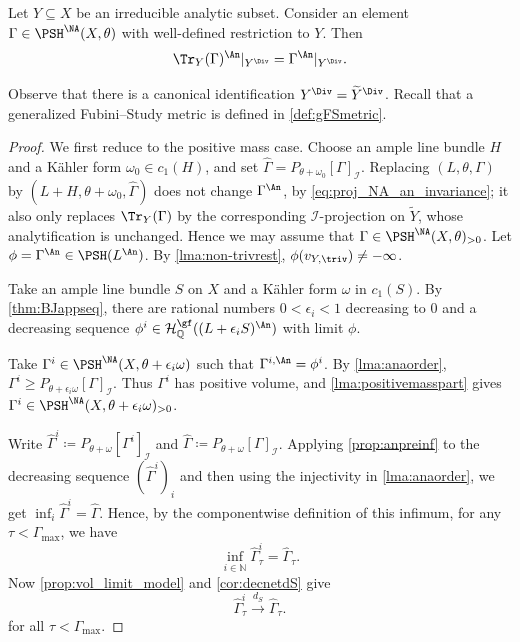 \begin{theorem}\label{thm:comp_traceop}
    Let $Y\subseteq X$ be an irreducible analytic subset.
    Consider an element $\Gamma\in \PSH^{\NA}(X,\theta)$ with well-defined restriction to $Y$. Then
    \begin{equation}\label{eq:Tracena}
    \Tr_Y(\Gamma)^{\An}|_{Y^{\Div}}=\Gamma^{\An}|_{Y^{\Div}}.
    \end{equation}
\end{theorem}
Observe that there is a canonical identification $Y^{\Div}=\widetilde{Y}^{\Div}$. Recall that a generalized Fubini--Study metric is defined in \cref{def:gFSmetric}.

\begin{proof}
    We first reduce to the positive mass case. Choose an ample line bundle $H$ and a K\"ahler form $\omega_0\in c_1(H)$, and set $\widehat{\Gamma}=P_{\theta+\omega_0}[\Gamma]_{\mathcal{I}}$. Replacing $(L,\theta,\Gamma)$ by $(L+H,\theta+\omega_0,\widehat{\Gamma})$ does not change $\Gamma^{\An}$, by \eqref{eq:proj_NA_an_invariance}; it also only replaces $\Tr_Y(\Gamma)$ by the corresponding $\mathcal{I}$-projection on $\widetilde{Y}$, whose analytification is unchanged. Hence we may assume that $\Gamma\in \PSH^{\NA}(X,\theta)_{>0}$.
    Let $\phi=\Gamma^{\An}\in \PSH(L^{\An})$. By \cref{lma:non-trivrest}, $\phi(v_{Y,\triv})\neq -\infty$.

    Take an ample line bundle $S$ on $X$ and a K\"ahler form $\omega$ in $c_1(S)$.
    By \cref{thm:BJappseq}, there are rational numbers $0<\epsilon_i<1$ decreasing to $0$ and a decreasing sequence $\phi^i\in\mathcal{H}^{\gf}_{\mathbb{Q}}((L+\epsilon_i S)^{\An})$ with limit $\phi$.

    Take $\Gamma^{i}\in \PSH^{\NA}(X,\theta+\epsilon_i\omega)$ such that $\Gamma^{i,\An}=\phi^{i}$. By \cref{lma:anaorder}, $\Gamma^i\geq P_{\theta+\epsilon_i\omega}[\Gamma]_{\mathcal I}$. Thus $\Gamma^i$ has positive volume, and \cref{lma:positivemasspart} gives $\Gamma^i\in \PSH^{\NA}(X,\theta+\epsilon_i\omega)_{>0}$.

    Write $\widehat{\Gamma}^i\coloneqq P_{\theta+\omega}[\Gamma^i]_{\mathcal{I}}$ and $\widehat{\Gamma}\coloneqq P_{\theta+\omega}[\Gamma]_{\mathcal{I}}$. Applying \cref{prop:anpreinf} to the decreasing sequence $(\widehat{\Gamma}^i)_i$ and then using the injectivity in \cref{lma:anaorder}, we get $\inf_i\widehat{\Gamma}^i=\widehat{\Gamma}$. Hence, by the componentwise definition of this infimum, for any $\tau<\Gamma_{\max}$, we have
    \[
    \inf_{i\in \mathbb{N}}\widehat{\Gamma}^{i}_{\tau}=\widehat{\Gamma}_{\tau}.
    \]
    Now \cref{prop:vol_limit_model} and \cref{cor:decnetdS} give
    \[
        \widehat{\Gamma}^{i}_{\tau}\xrightarrow{d_S} \widehat{\Gamma}_{\tau}.
    \]
    for all $\tau<\Gamma_{\max}$.


\end{proof}
